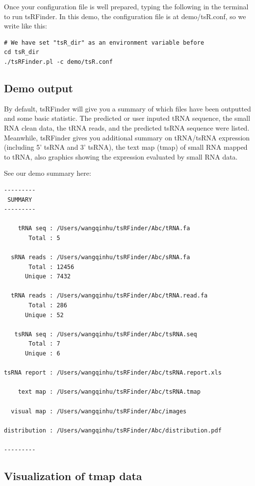 \documentclass[11pt, a4paper]{article}
\begin{document}
Once your configuration file is well prepared, typing the following in the terminal to run tsRFinder. In this demo, the configuration file is at demo/tsR.conf, so we write like this:

\begin{verbatim}
# We have set "tsR_dir" as an environment variable before
cd tsR_dir
./tsRFinder.pl -c demo/tsR.conf
\end{verbatim}

\subsection{Demo output}

By default, tsRFinder will give you a summary of which files have been outputted and some basic statistic. The predicted or user inputed tRNA sequence, the small RNA clean data, the tRNA reads, and the predicted tsRNA sequence were listed. Meanwhile, tsRFinder gives you additional summary on tRNA/tsRNA expression (including 5' tsRNA and 3' tsRNA), the text map (tmap) of small RNA mapped to tRNA, also graphics showing the expression evaluated by small RNA data.

See our demo summary here:

{\small \begin{verbatim}
---------
 SUMMARY 
---------

    tRNA seq : /Users/wangqinhu/tsRFinder/Abc/tRNA.fa
       Total : 5

  sRNA reads : /Users/wangqinhu/tsRFinder/Abc/sRNA.fa
       Total : 12456
      Unique : 7432

  tRNA reads : /Users/wangqinhu/tsRFinder/Abc/tRNA.read.fa
       Total : 286
      Unique : 52

   tsRNA seq : /Users/wangqinhu/tsRFinder/Abc/tsRNA.seq
       Total : 7
      Unique : 6

tsRNA report : /Users/wangqinhu/tsRFinder/Abc/tsRNA.report.xls

    text map : /Users/wangqinhu/tsRFinder/Abc/tsRNA.tmap

  visual map : /Users/wangqinhu/tsRFinder/Abc/images

distribution : /Users/wangqinhu/tsRFinder/Abc/distribution.pdf

---------
\end{verbatim}
}

\subsection{Visualization of tmap data}
\end{document}
